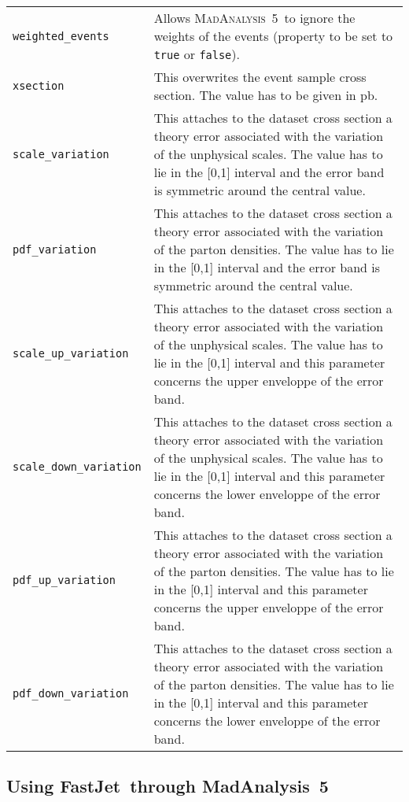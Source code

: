 \documentclass[a4paper]{article}
\newcommand{\MA}{\textsc{MadAnalysis}~5}
\newcommand{\MAnorm}{{MadAnalysis}~5}
\newcommand{\FJnorm}{{FastJet}}
\begin{document}
\begin{center}
\begin{tabular}{l p{9.1cm}}
\color{ao} \verb?weighted_events? & Allows \MA\ to ignore the weights of the events
  (property to be set to \verb?true? or \verb?false?).\\
\color{ao} \verb?xsection?  & This overwrites the event sample cross section. The value has
  to be given in pb.\\
\color{ao} \verb?scale_variation? & This attaches to the dataset cross section
  a theory error associated with the variation of the unphysical scales. The
  value has to lie in the [0,1] interval and the error band is symmetric around
  the central value. \\
\color{ao} \verb?pdf_variation?   &  This attaches to the dataset cross section
  a theory error associated with the variation of the parton densities. The
  value has to lie in the [0,1] interval and the error band is symmetric around
  the central value. \\
\color{ao} \verb?scale_up_variation? & This attaches to the dataset cross section
  a theory error associated with the variation of the unphysical scales. The
  value has to lie in the [0,1] interval and this parameter concerns the upper
  enveloppe of the error band.\\
\color{ao} \verb?scale_down_variation? & This attaches to the dataset cross section
  a theory error associated with the variation of the unphysical scales. The
  value has to lie in the [0,1] interval and this parameter concerns the lower
  enveloppe of the error band.\\
\color{ao} \verb?pdf_up_variation? &
  This attaches to the dataset cross section
  a theory error associated with the variation of the parton densities. The
  value has to lie in the [0,1] interval and this parameter concerns the upper
  enveloppe of the error band.\\
\color{ao} \verb?pdf_down_variation? &
  This attaches to the dataset cross section
  a theory error associated with the variation of the parton densities. The
  value has to lie in the [0,1] interval and this parameter concerns the lower
  enveloppe of the error band.\\
\hline
\end{tabular}
\end{center}

\vspace{2cm}

\begin{shaded}
\section{\Large Using \FJnorm\ through \MAnorm}\label{sec:fastjet}
\end{shaded}
\end{document}
